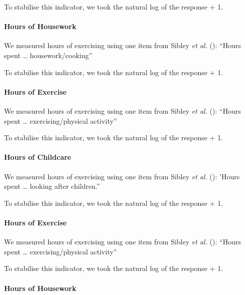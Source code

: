 \documentclass[
  singlecolumn]{article}
\let\oldparagraph\paragraph
\renewcommand{\paragraph}[1]{\oldparagraph{#1}\mbox{}}
\begin{document}
To stabilise this indicator, we took the natural log of the response +
1.

\paragraph{Hours of Housework}\label{hours-of-housework}

We measured hours of exercising using one item from Sibley \emph{et al.}
(): ``Hours spent \ldots{}
housework/cooking''

To stabilise this indicator, we took the natural log of the response +
1.

\paragraph{Hours of Exercise}\label{hours-of-exercise}

We measured hours of exercising using one item from Sibley \emph{et al.}
(): ``Hours spent \ldots{}
exercising/physical activity''

To stabilise this indicator, we took the natural log of the response +
1.

\paragraph{Hours of Childcare}\label{hours-of-childcare-1}

We measured hours of exercising using one item from Sibley \emph{et al.}
(): 'Hours spent \ldots{} looking after
children.''

To stabilise this indicator, we took the natural log of the response +
1.

\paragraph{Hours of Exercise}\label{hours-of-exercise-1}

We measured hours of exercising using one item from Sibley \emph{et al.}
(): ``Hours spent \ldots{}
exercising/physical activity''

To stabilise this indicator, we took the natural log of the response +
1.

\paragraph{Hours of Housework}\label{hours-of-housework-1}
\end{document}
